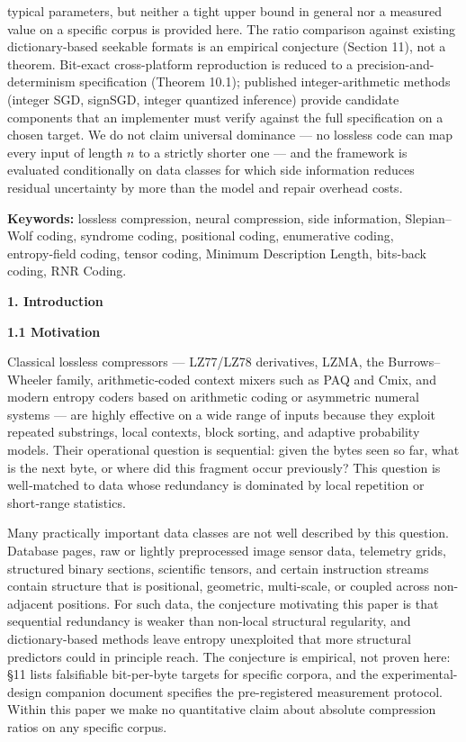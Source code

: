 \documentclass[
]{article}
\begin{document}
typical parameters, but neither a tight upper bound in general nor
a measured value on a specific corpus is provided here. The
ratio comparison against existing dictionary-based seekable formats
is an empirical conjecture (Section 11), not a theorem. Bit-exact cross-platform reproduction is
reduced to a precision-and-determinism specification (Theorem 10.1);
published integer-arithmetic methods (integer SGD, signSGD, integer
quantized inference) provide candidate components that an implementer
must verify against the full specification on a chosen target. We do not claim universal
dominance --- no lossless code can map every input of length $n$ to a
strictly shorter one --- and the framework is evaluated conditionally
on data classes for which side information reduces residual
uncertainty by more than the model and repair overhead costs.

\textbf{Keywords:} lossless compression, neural compression, side
information, Slepian--Wolf coding, syndrome coding, positional coding,
enumerative coding, entropy‑field coding, tensor coding, Minimum
Description Length, bits‑back coding, RNR Coding.

\textbf{1. Introduction}

\textbf{1.1 Motivation}

Classical lossless compressors --- LZ77/LZ78 derivatives, LZMA, the
Burrows--Wheeler family, arithmetic‑coded context mixers such as PAQ and
Cmix, and modern entropy coders based on arithmetic coding or asymmetric
numeral systems --- are highly effective on a wide range of inputs
because they exploit repeated substrings, local contexts, block sorting,
and adaptive probability models. Their operational question is
sequential: given the bytes seen so far, what is the next byte, or where
did this fragment occur previously? This question is well‑matched to
data whose redundancy is dominated by local repetition or short‑range
statistics.

Many practically important data classes are not well described by this
question. Database pages, raw or lightly preprocessed image sensor data,
telemetry grids, structured binary sections, scientific tensors, and
certain instruction streams contain structure that is positional,
geometric, multi-scale, or coupled across non-adjacent positions. For
such data, the conjecture motivating this paper is that sequential
redundancy is weaker than non-local structural regularity, and
dictionary-based methods leave entropy unexploited that more structural
predictors could in principle reach. The conjecture is empirical, not
proven here: §11 lists falsifiable bit-per-byte targets for specific
corpora, and the experimental-design companion document specifies the
pre-registered measurement protocol. Within this paper we make no
quantitative claim about absolute compression ratios on any specific
corpus.
\end{document}
